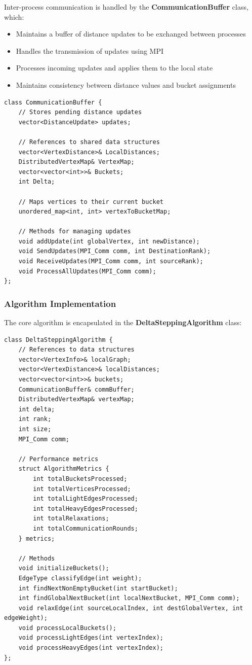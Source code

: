 \documentclass{article}
\begin{document}
Inter-process communication is handled by the \textbf{CommunicationBuffer} class, which:

\begin{itemize}
    \item Maintains a buffer of distance updates to be exchanged between processes
    \item Handles the transmission of updates using MPI
    \item Processes incoming updates and applies them to the local state
    \item Maintains consistency between distance values and bucket assignments
\end{itemize}

\begin{verbatim}
class CommunicationBuffer {
    // Stores pending distance updates
    vector<DistanceUpdate> updates;
    
    // References to shared data structures
    vector<VertexDistance>& LocalDistances;
    DistributedVertexMap& VertexMap;
    vector<vector<int>>& Buckets;
    int Delta;
    
    // Maps vertices to their current bucket
    unordered_map<int, int> vertexToBucketMap;
    
    // Methods for managing updates
    void addUpdate(int globalVertex, int newDistance);
    void SendUpdates(MPI_Comm comm, int DestinationRank);
    void ReceiveUpdates(MPI_Comm comm, int sourceRank);
    void ProcessAllUpdates(MPI_Comm comm);
};
\end{verbatim}

\subsubsection*{Algorithm Implementation}

The core algorithm is encapsulated in the \textbf{DeltaSteppingAlgorithm} class:

\begin{verbatim}
class DeltaSteppingAlgorithm {
    // References to data structures
    vector<VertexInfo>& localGraph;
    vector<VertexDistance>& localDistances;
    vector<vector<int>>& buckets;
    CommunicationBuffer& commBuffer;
    DistributedVertexMap& vertexMap;
    int delta;
    int rank;
    int size;
    MPI_Comm comm;
    
    // Performance metrics
    struct AlgorithmMetrics {
        int totalBucketsProcessed;
        int totalVerticesProcessed;
        int totalLightEdgesProcessed;
        int totalHeavyEdgesProcessed;
        int totalRelaxations;
        int totalCommunicationRounds;
    } metrics;
    
    // Methods
    void initializeBuckets();
    EdgeType classifyEdge(int weight);
    int findNextNonEmptyBucket(int startBucket);
    int findGlobalNextBucket(int localNextBucket, MPI_Comm comm);
    void relaxEdge(int sourceLocalIndex, int destGlobalVertex, int edgeWeight);
    void processLocalBuckets();
    void processLightEdges(int vertexIndex);
    void processHeavyEdges(int vertexIndex);
};
\end{verbatim}
\end{document}
